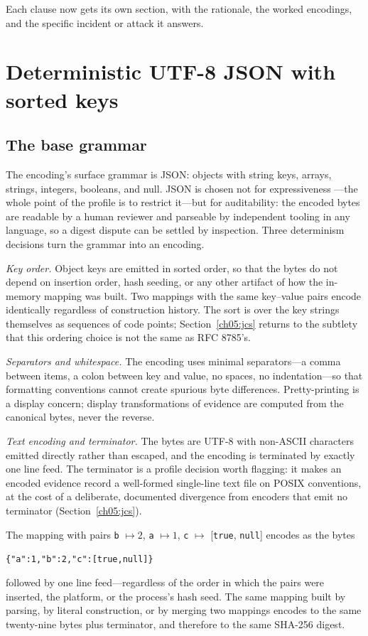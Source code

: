 Each clause now gets its own section, with the rationale, the worked
encodings, and the specific incident or attack it answers.

\section{Deterministic UTF-8 JSON with sorted keys}\label{ch05:json}

\subsection{The base grammar}

The encoding's surface grammar is JSON: objects with string keys, arrays,
strings, integers, booleans, and null. JSON is chosen not for expressiveness
---the whole point of the profile is to restrict it---but for auditability:
the encoded bytes are readable by a human reviewer and parseable by
independent tooling in any language, so a digest dispute can be settled by
inspection. Three determinism decisions turn the grammar into an encoding.

\emph{Key order.} Object keys are emitted in sorted order, so that the bytes
do not depend on insertion order, hash seeding, or any other artifact of how
the in-memory mapping was built. Two mappings with the same key--value pairs
encode identically regardless of construction history. The sort is over the
key strings themselves as sequences of code points; Section~\ref{ch05:jcs}
returns to the subtlety that this ordering choice is not the same as RFC
8785's.

\emph{Separators and whitespace.} The encoding uses minimal separators---a
comma between items, a colon between key and value, no spaces, no
indentation---so that formatting conventions cannot create spurious byte
differences. Pretty-printing is a display concern; display transformations
of evidence are computed from the canonical bytes, never the reverse.

\emph{Text encoding and terminator.} The bytes are UTF-8 with non-ASCII
characters emitted directly rather than escaped, and the encoding is
terminated by exactly one line feed. The terminator is a profile decision
worth flagging: it makes an encoded evidence record a well-formed
single-line text file on POSIX conventions, at the cost of a deliberate,
documented divergence from encoders that emit no terminator
(Section~\ref{ch05:jcs}).

\begin{example}\label{ch05:ex:base}
The mapping with pairs \texttt{b} $\mapsto 2$, \texttt{a} $\mapsto 1$,
\texttt{c} $\mapsto$ [\texttt{true}, \texttt{null}] encodes as the bytes
\begin{center}
\texttt{\{"a":1,"b":2,"c":[true,null]\}}
\end{center}
followed by one line feed---regardless of the order in which the pairs were
inserted, the platform, or the process's hash seed. The same mapping built
by parsing, by literal construction, or by merging two mappings encodes to
the same twenty-nine bytes plus terminator, and therefore to the same
SHA-256 digest.
\end{example}

